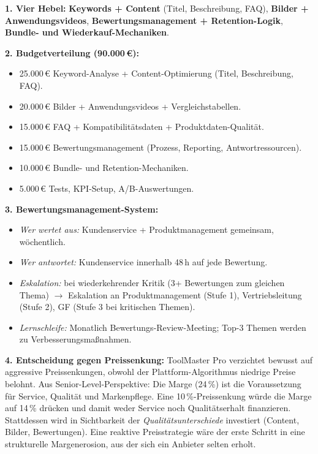 \documentclass[11pt,a4paper,oneside]{article}
\begin{document}
\begin{loesungbox}
\textbf{1. Vier Hebel:}
\textbf{Keywords + Content} (Titel, Beschreibung, FAQ), \textbf{Bilder + Anwendungsvideos}, \textbf{Bewertungsmanagement + Retention-Logik}, \textbf{Bundle- und Wiederkauf-Mechaniken}.

\textbf{2. Budgetverteilung (90.000\,\euro):}
\begin{itemize}
  \item 25.000\,\euro{} \textendash{} Keyword-Analyse + Content-Optimierung (Titel, Beschreibung, FAQ).
  \item 20.000\,\euro{} \textendash{} Bilder + Anwendungsvideos + Vergleichstabellen.
  \item 15.000\,\euro{} \textendash{} FAQ + Kompatibilitätsdaten + Produktdaten-Qualität.
  \item 15.000\,\euro{} \textendash{} Bewertungsmanagement (Prozess, Reporting, Antwortressourcen).
  \item 10.000\,\euro{} \textendash{} Bundle- und Retention-Mechaniken.
  \item 5.000\,\euro{} \textendash{} Tests, KPI-Setup, A/B-Auswertungen.
\end{itemize}

\textbf{3. Bewertungsmanagement-System:}
\begin{itemize}
  \item \emph{Wer wertet aus:} Kundenservice + Produktmanagement gemeinsam, wöchentlich.
  \item \emph{Wer antwortet:} Kundenservice innerhalb 48\,h auf jede Bewertung.
  \item \emph{Eskalation:} bei wiederkehrender Kritik (3+ Bewertungen zum gleichen Thema) $\rightarrow$ Eskalation an Produktmanagement (Stufe 1), Vertriebsleitung (Stufe 2), GF (Stufe 3 bei kritischen Themen).
  \item \emph{Lernschleife:} Monatlich Bewertungs-Review-Meeting; Top-3 Themen werden zu Verbesserungsmaßnahmen.
\end{itemize}

\textbf{4. Entscheidung gegen Preissenkung:}
ToolMaster Pro verzichtet bewusst auf aggressive Preissenkungen, obwohl der Plattform-Algorithmus niedrige Preise belohnt. Aus Senior-Level-Perspektive: Die Marge (24\,\%) ist die Voraussetzung für Service, Qualität und Markenpflege. Eine 10\,\%-Preissenkung würde die Marge auf 14\,\% drücken \textendash{} und damit weder Service noch Qualitätserhalt finanzieren. Stattdessen wird in Sichtbarkeit der \emph{Qualitätsunterschiede} investiert (Content, Bilder, Bewertungen). Eine reaktive Preisstrategie wäre der erste Schritt in eine strukturelle Margenerosion, aus der sich ein Anbieter selten erholt.


\end{loesungbox}
\end{document}
